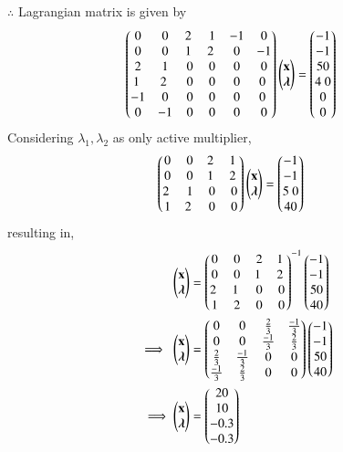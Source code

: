 $\therefore$ Lagrangian matrix is given by
\begin{align}
\myvec{0 & 0 & 2 & 1& -1 & 0 \\ 0 & 0 & 1 & 2  & 0 & -1 \\ 2 & 1 & 0 & 0 & 0 & 0 \\ 1 & 2 & 0 & 0 & 0 & 0  \\ -1 & 0 & 0 & 0 & 0 & 0  \\ 0 & -1 & 0 & 0 & 0 & 0 }\myvec{\vec{x} \\ \boldsymbol{\lambda} } &= \myvec{-1 \\ -1 \\ 50\\ 4 0\\ 0 \\0 }
\end{align}
Considering $\lambda_1,\lambda_2$ as only active multiplier,
\begin{align}
\myvec{0 & 0 & 2 & 1 \\ 0 & 0 & 1 & 2 \\ 2 & 1 & 0 & 0 \\ 1 & 2 & 0 & 0}\myvec{\vec{x}\\ \boldsymbol{\lambda}} &= \myvec{-1 \\ -1 \\ 5 0\\ 40}
\end{align}
resulting in,
\begin{align}
\myvec{\vec{x} \\ \boldsymbol{\lambda}} &= \myvec{0 & 0 & 2 & 1 \\ 0 & 0 & 1 & 2 \\ 2 & 1 & 0 & 0 \\ 1& 2 & 0 & 0}^{-1}\myvec{-1 \\ -1 \\ 50 \\ 40}
\\
\implies   \myvec{\vec{x} \\ \boldsymbol{\lambda}} &= \myvec{0 & 0 & \frac{2}{3} & \frac{-1}{3} \\ 0 & 0 & \frac{-1}{3} & \frac{2}{3} \\ \frac{2}{3} & \frac{-1}{3} & 0 & 0 \\ \frac{-1}{3} & \frac{2}{3} & 0 & 0}\myvec{-1 \\ -1 \\ 50 \\ 40}
\\
\implies \myvec{\vec{x} \\ \boldsymbol{\lambda}} &= \myvec{20 \\ 10 \\ -0.3 \\ -0.3 }
\end{align}
